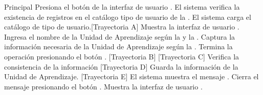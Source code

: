 \begin{UCtrayectoria}{Principal}
    \UCpaso[\UCactor] Presiona el botón \IUbutton{+} de la interfaz de usuario .
    \UCpaso El sistema verifica la existencia de registros en el catálogo tipo de usuario de la  .
    \UCpaso El sistema carga el catálogo de tipo de usuario.[Trayectoria A]
    \UCpaso Muestra la interfaz de usuario .
    \UCpaso[\UCactor] Ingresa el nombre de la Unidad de Aprendizaje según la  y la .
    \UCpaso[\UCactor] Captura la información necesaria de la Unidad de Aprendizaje según la .
    \UCpaso[\UCactor] Termina la operación presionando el botón . [Trayectoria B] [Trayectoria C]
    \UCpaso Verifica la consistencia de la información [Trayectoria D]
    \UCpaso Guarda la información de la Unidad de Aprendizaje. [Trayectoria E]
    \UCpaso El sistema muestra el mensaje .
    \UCpaso[\UCactor] Cierra el mensaje presionando el botón .
    \UCpaso Muestra la interfaz de usuario .
  
\end{UCtrayectoria}


